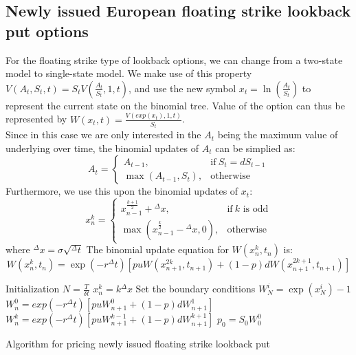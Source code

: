 \subsection{Newly issued European floating strike lookback put options}
For the floating strike type of lookback options, we can change from a two-state model to single-state model. We make use of this property $V(A_{t},S_{t},t) = S_{t}V(\frac{A_{t}}{S_{t}}, 1, t)$, and use the new symbol $x_{t} = \ln(\frac{A_{t}}{S_{t}})$ to represent the current state on the binomial tree. Value of the option can thus be represented by $W(x_{t}, t) = \frac{V(exp(x_{t}), 1, t)}{S_{t}}$.\\
Since in this case we are only interested in the $A_{t}$ being the maximum value of underlying over time, the binomial updates of $A_{t}$ can be simplied as:
\begin{equation}
  A_{t}=
  \begin{cases}
    A_{t-1}, & \text{if}\ S_{t} = dS_{t-1} \\
    \max(A_{t-1}, S_{t}), & \text{otherwise}
  \end{cases}
\end{equation}
Furthermore, we use this upon the binomial updates of $x_{t}$:
\begin{equation}
  x_{n}^{k}=
  \begin{cases}
    x_{n-1}^{\frac{k+1}{2}} + {^{\Delta}x}, & \text{if}\ k \text{ is odd} \\
    \max(x_{n-1}^{\frac{k}{2}} - {^{\Delta}x}, 0), & \text{otherwise}
  \end{cases}
\end{equation}
where ${^{\Delta}x} = \sigma \sqrt{^{\Delta}t}$
The binomial update equation for $W(x_{n}^{k}, t_{n})$ is:
$$ W(x_{n}^{k}, t_{n}) = \exp(-r{^{\Delta}t})[puW(x_{n+1}^{2k}, t_{n+1}) + (1-p)dW(x_{n+1}^{2k+1}, t_{n+1})] $$
\begin{algorithm}[H]
 Initialization\;
 $N = \frac{T}{\delta t}$\;
 $x_{n}^{k} = k{^{\Delta}x}$\;
 Set the boundary conditions\;
  {
  $W_{N}^{i} = \exp(x_{N}^{i}) - 1$\;
 }
  {
   {
    $W_{n}^{0} = exp(-r{^{\Delta}t})[puW_{n+1}^{0}+(1-p)dW_{n+1}^{1}]$\;
  }
   {
    $W_{n}^{k} = exp(-r{^{\Delta}t})[puW_{n+1}^{k-1}+(1-p)dW_{n+1}^{k+1}]$\;
  }
 }
 $p_{0} = S_{0}W_{0}^{0}$\;
\caption{Algorithm for pricing newly issued floating strike lookback put}
\end{algorithm}
\newpage

